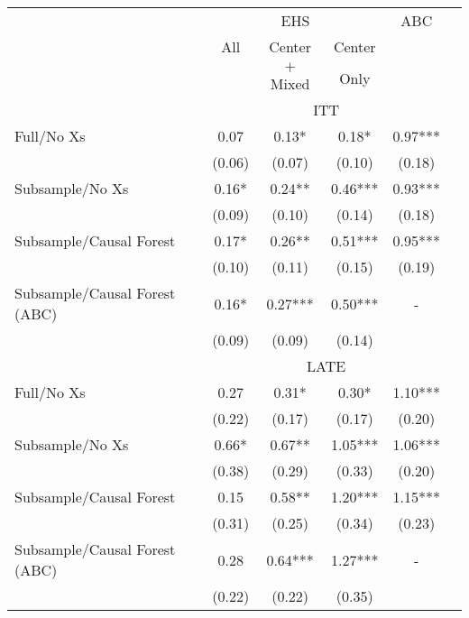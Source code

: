\begin{tabular}{lccccc}
\toprule 
\midrule 
 & \multicolumn{3}{c}{EHS} & ABC \\
 \cmidrule(lr){2-4} 
 & All & Center & Center &  \\
 &  & $+$ Mixed & Only &  \\
\midrule 
 & \multicolumn{4}{c}{ITT} \\
 \cmidrule(lr){2-5} 
Full/No Xs & 0.07 & 0.13* & 0.18* & 0.97*** \\
 & (0.06) & (0.07) & (0.10) & (0.18) \\
Subsample/No Xs & 0.16* & 0.24** & 0.46*** & 0.93*** \\
 & (0.09) & (0.10) & (0.14) & (0.18) \\
Subsample/Causal Forest & 0.17* & 0.26** & 0.51*** & 0.95*** \\
 & (0.10) & (0.11) & (0.15) & (0.19) \\
Subsample/Causal Forest (ABC) & 0.16* & 0.27*** & 0.50*** & - \\
 & (0.09) & (0.09) & (0.14) \\
\midrule 
 & \multicolumn{4}{c}{LATE} \\
 \cmidrule(lr){2-5} 
Full/No Xs & 0.27 & 0.31* & 0.30* & 1.10*** \\
 & (0.22) & (0.17) & (0.17) & (0.20) \\
Subsample/No Xs & 0.66* & 0.67** & 1.05*** & 1.06*** \\
 & (0.38) & (0.29) & (0.33) & (0.20) \\
Subsample/Causal Forest & 0.15 & 0.58** & 1.20*** & 1.15*** \\
 & (0.31) & (0.25) & (0.34) & (0.23) \\
Subsample/Causal Forest (ABC) & 0.28 & 0.64*** & 1.27*** & - \\
 & (0.22) & (0.22) & (0.35) \\
\midrule 
\bottomrule 
\end{tabular}
